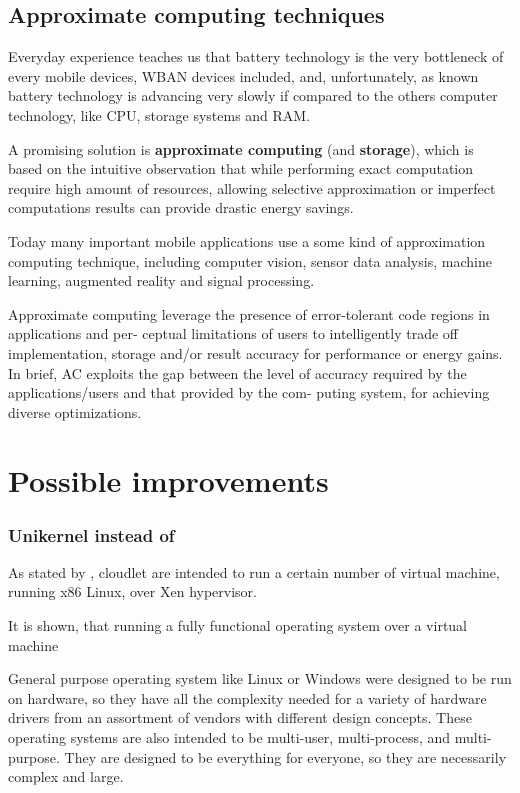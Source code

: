 \documentclass[sigchi]{acmart}
\begin{document}
\subsection{Approximate computing techniques}

Everyday experience teaches us that battery technology is the very bottleneck of every mobile devices, WBAN devices included, and, unfortunately, as known battery technology is advancing very slowly if compared to the others computer technology, like CPU, storage systems and RAM.

A promising solution is \textbf{approximate computing} (and \textbf{storage}), which is based on the intuitive observation that while performing exact computation require high amount of resources, allowing selective approximation or imperfect computations results can provide drastic energy savings.

Today many important mobile applications use a some kind of approximation computing technique, including computer vision, sensor data analysis, machine learning, augmented reality and signal processing. 

Approximate computing leverage the presence of error-tolerant code regions in applications and per-
ceptual limitations of users to intelligently trade off implementation, storage and/or
result accuracy for performance or energy gains. In brief, AC exploits the gap between
the level of accuracy required by the applications/users and that provided by the com-
puting system, for achieving diverse optimizations.



\section{Possible improvements}

\subsubsection{Unikernel instead of }

As stated by \citet{MSAReport}, cloudlet are intended to run a certain number of virtual machine, running x86 Linux, over Xen hypervisor.

It is shown, that running a fully functional operating system over a virtual machine 

General purpose operating system like Linux or Windows were designed to be run on hardware, so they have all the complexity needed for a variety of hardware drivers from an assortment of vendors with different design concepts. These operating systems are also intended to be multi-user, multi-process, and multi-purpose. They are designed to be everything for everyone, so they are necessarily complex and large.







\appendix
\end{document}
